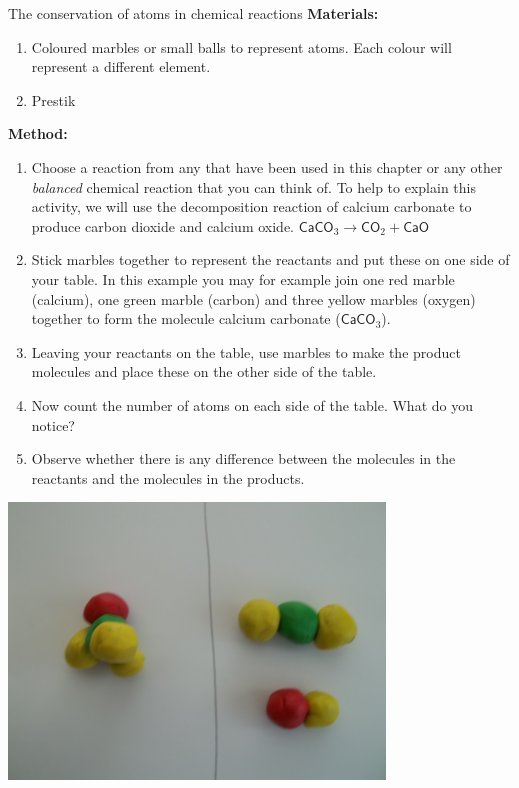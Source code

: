             \begin{activity}{The conservation of atoms in chemical reactions }
            \nopagebreak
            \label{m38711*id64844}\noindent{}\textbf{Materials:}
      \label{m38711*id64853}\begin{enumerate}[noitemsep, label=\textbf{\arabic*}. ] 
            \label{m38711*uid33}\item Coloured marbles or small balls to represent atoms. Each colour will represent a different element.
\label{m38711*uid34}\item Prestik
\end{enumerate}
        \par 

      \label{m38711*id64882}\noindent{}\textbf{Method:}\\
\begin{minipage}{.6\textwidth}
      \label{m38711*id64889}\begin{enumerate}[noitemsep, label=\textbf{\arabic*}. ] 
            \label{m38711*uid35}\item Choose a reaction from any that have been used in this chapter or any other \textsl{balanced} chemical reaction that you can think of. To help to explain this activity, we will use the decomposition reaction of calcium carbonate to produce carbon dioxide and calcium oxide.
${\mathsf{CaCO}}_{3}\to {\mathsf{CO}}_{2}+\mathsf{CaO}$
\label{m38711*uid36}\item Stick marbles together to represent the reactants and put these on one side of your table. In this example you may for example join one red marble (calcium), one green marble (carbon) and three yellow marbles (oxygen) together to form the molecule calcium carbonate (${\mathsf{CaCO}}_{3}$).
\label{m38711*uid37}\item Leaving your reactants on the table, use marbles to make the product molecules and place these on the other side of the table.
\label{m38711*uid38}\item Now count the number of atoms on each side of the table. What do you notice?
\label{m38711*uid39}\item Observe whether there is any difference between the molecules in the reactants and the molecules in the products.
\end{enumerate}
\end{minipage}
\begin{minipage}{.4\textwidth}
 \begin{center}
 \includegraphics[width=.6\textwidth]{photos/balancing3.png}\par

\end{center}
\end{minipage}
\end{activity}
